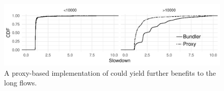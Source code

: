 \begin{figure}
    \centering
\begin{knitrout}
\color{fgcolor}
\includegraphics[width=\maxwidth]{figure/eval:proxy-1} 

\end{knitrout}
    \caption{A proxy-based implementation of \name could yield further benefits to the long flows.}
    \label{fig:eval:proxy}
\end{figure}
